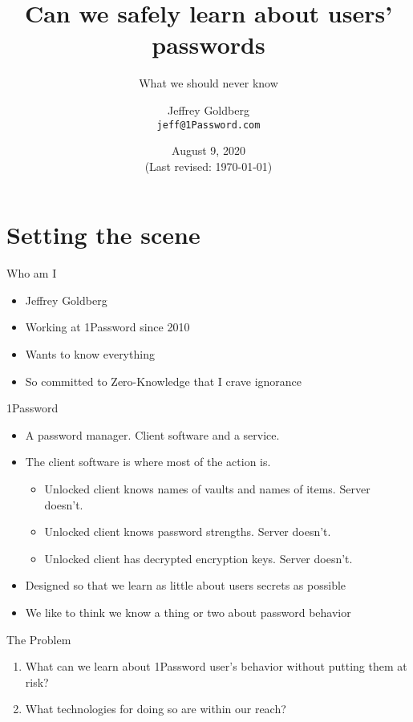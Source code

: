 \documentclass[xcolor={dvipsnames,table,hyperref}]{beamer}
\author[J.~Goldberg]
{Jeffrey Goldberg\texorpdfstring{\\ \texttt{jeff@1Password.com}}{}}
\institute[1Password]{1Password}
\title{Can we safely learn about users' passwords}
\subtitle{What we should never know}
\date{August 9, 2020\\
\footnotesize{(Last revised: \today)}}
\begin{document}
\maketitle

\section{Setting the scene}

\begin{frame}{Who am I}
  \begin{itemize}
    \item Jeffrey Goldberg
    \item Working at 1Password since 2010
    \item Wants to know everything
    \item So committed to Zero-Knowledge that I crave ignorance
  \end{itemize}

\end{frame}

\begin{frame}{1Password}
  \begin{itemize}
    \item A password manager. Client software and a service.
    \item The client software is where most of the action is.
          \begin{itemize}
            \item Unlocked client knows names of vaults and names of items. Server doesn't.
            \item Unlocked client knows password strengths. Server doesn't.
            \item Unlocked client has decrypted encryption keys. Server doesn't.
          \end{itemize}
    \item Designed so that we learn as little about users secrets as possible
    \item We like to think we know a thing or two about password behavior
  \end{itemize}
\end{frame}

\begin{frame}{The Problem}
  \begin{enumerate}
    \item What can we learn about 1Password user's behavior without putting them at risk?
    \item What technologies for doing so are within our reach?
  \end{enumerate}
\end{frame}
\end{document}
